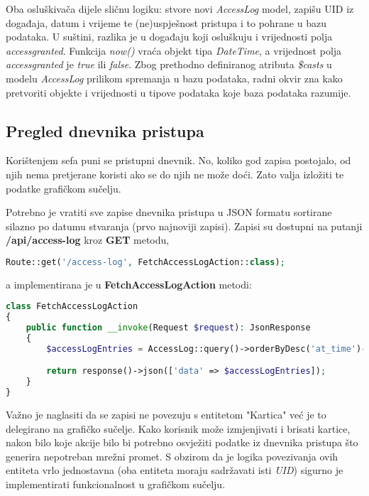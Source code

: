 Oba osluškivača dijele sličnu logiku: stvore novi \textit{AccessLog} model, zapišu UID iz događaja, datum i vrijeme te
(ne)uspješnost pristupa i to pohrane u bazu podataka.
U suštini, razlika je u događaju koji osluškuju i vrijednosti polja \textit{access\textunderscore granted}.
Funkcija \textit{now()} vraća objekt tipa \textit{DateTime}, a vrijednost polja \textit{access\textunderscore granted}
je \textit{true} ili \textit{false}.
Zbog prethodno definiranog atributa \textit{\$casts} u modelu \textit{AccessLog} prilikom spremanja u bazu podataka,
radni okvir zna kako pretvoriti objekte i vrijednosti u tipove podataka koje baza podataka razumije.

\subsection{Pregled dnevnika pristupa}

Korištenjem sefa puni se pristupni dnevnik.
No, koliko god zapisa postojalo, od njih nema pretjerane koristi ako se do njih ne može doći.
Zato valja izložiti te podatke grafičkom sučelju.

Potrebno je vratiti sve zapise dnevnika pristupa u JSON formatu sortirane silazno po datumu stvaranja (prvo najnoviji zapisi).
Zapisi su dostupni na putanji \textbf{/api/access-log} kroz \textbf{GET} metodu,

\begin{lstlisting}[language=PHP]
Route::get('/access-log', FetchAccessLogAction::class);
\end{lstlisting}

a implementirana je u \textbf{FetchAccessLogAction} metodi:

\begin{lstlisting}[language=PHP]
class FetchAccessLogAction
{
    public function __invoke(Request $request): JsonResponse
    {
        $accessLogEntries = AccessLog::query()->orderByDesc('at_time')->get();

        return response()->json(['data' => $accessLogEntries]);
    }
}
\end{lstlisting}

Važno je naglasiti da se zapisi ne povezuju s entitetom "Kartica" već je to delegirano na grafičko sučelje.
Kako korisnik može izmjenjivati i brisati kartice, nakon bilo koje akcije bilo bi potrebno osvježiti podatke iz dnevnika
pristupa što generira nepotreban mrežni promet.
S obzirom da je logika povezivanja ovih entiteta vrlo jednostavna (oba entiteta moraju sadržavati isti \textit{UID})
sigurno je implementirati funkcionalnost u grafičkom sučelju.
